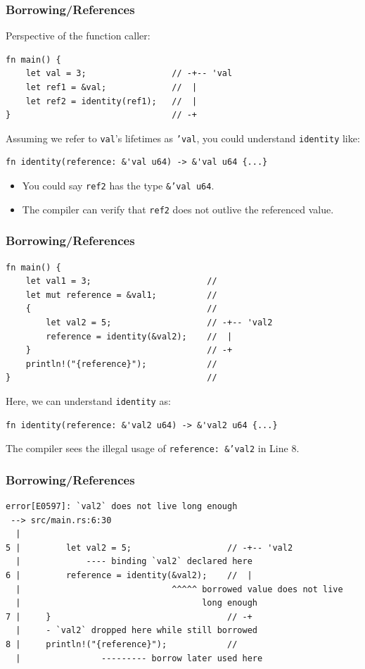 \begin{frame}[fragile]
    \frametitle{Borrowing/References}
    Perspective of the function caller:
    \vfill
    \begin{verbatim}
fn main() {
    let val = 3;                 // -+-- 'val
    let ref1 = &val;             //  |
    let ref2 = identity(ref1);   //  |
}                                // -+
    \end{verbatim}
    \pause
    \vfill
    Assuming we refer to \texttt{val}'s lifetimes as \texttt{'val}, you could understand \texttt{identity} like:
    \begin{verbatim}
fn identity(reference: &'val u64) -> &'val u64 {...}
    \end{verbatim}
    \pause
    \vfill
    \begin{itemize}
        \item You could say \texttt{ref2} has the type \texttt{\&'val u64}.
        \item The compiler can verify that \texttt{ref2} does not outlive the referenced value.
    \end{itemize}
\end{frame}

\begin{frame}[fragile]
    \frametitle{Borrowing/References}
    \begin{verbatim}
fn main() {
    let val1 = 3;                       //
    let mut reference = &val1;          // 
    {                                   //
        let val2 = 5;                   // -+-- 'val2
        reference = identity(&val2);    //  |
    }                                   // -+
    println!("{reference}");            //
}                                       //
    \end{verbatim}
    \pause
    \vfill
    Here, we can understand \texttt{identity} as:
    \begin{verbatim}
fn identity(reference: &'val2 u64) -> &'val2 u64 {...}
    \end{verbatim}
    \pause
    \vfill
    The compiler sees the illegal usage of \texttt{reference: \&'val2} in Line 8.
\end{frame}

\begin{frame}[fragile]
    \frametitle{Borrowing/References}
    \begin{verbatim}
error[E0597]: `val2` does not live long enough
 --> src/main.rs:6:30
  |
5 |         let val2 = 5;                   // -+-- 'val2
  |             ---- binding `val2` declared here
6 |         reference = identity(&val2);    //  |
  |                              ^^^^^ borrowed value does not live
  |                                    long enough
7 |     }                                   // -+
  |     - `val2` dropped here while still borrowed
8 |     println!("{reference}");            //
  |                --------- borrow later used here
    \end{verbatim}
\end{frame}

